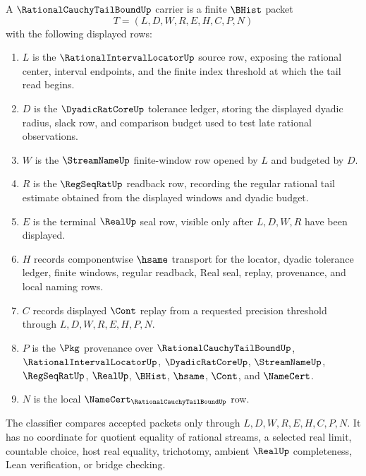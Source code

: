 \begin{definition}
\label{def:rational-cauchy-tail-bound-carrier}
A $\RationalCauchyTailBoundUp$ carrier is a finite $\BHist$ packet
$$
T=(L,D,W,R,E,H,C,P,N)
$$
with the following displayed rows:
\begin{enumerate}
\item $L$ is the $\RationalIntervalLocatorUp$ source row, exposing the rational center, interval endpoints, and the finite index threshold at which the tail read begins.
\item $D$ is the $\DyadicRatCoreUp$ tolerance ledger, storing the displayed dyadic radius, slack row, and comparison budget used to test late rational observations.
\item $W$ is the $\StreamNameUp$ finite-window row opened by $L$ and budgeted by $D$.
\item $R$ is the $\RegSeqRatUp$ readback row, recording the regular rational tail estimate obtained from the displayed windows and dyadic budget.
\item $E$ is the terminal $\RealUp$ seal row, visible only after $L,D,W,R$ have been displayed.
\item $H$ records componentwise $\hsame$ transport for the locator, dyadic tolerance ledger, finite windows, regular readback, Real seal, replay, provenance, and local naming rows.
\item $C$ records displayed $\Cont$ replay from a requested precision threshold through $L,D,W,R,E,H,P,N$.
\item $P$ is the $\Pkg$ provenance over $\RationalCauchyTailBoundUp$, $\RationalIntervalLocatorUp$, $\DyadicRatCoreUp$, $\StreamNameUp$, $\RegSeqRatUp$, $\RealUp$, $\BHist$, $\hsame$, $\Cont$, and $\NameCert$.
\item $N$ is the local $\NameCert_{\RationalCauchyTailBoundUp}$ row.
\end{enumerate}
The classifier compares accepted packets only through $L,D,W,R,E,H,C,P,N$. It has no coordinate for quotient equality of rational streams, a selected real limit, countable choice, host real equality, trichotomy, ambient $\RealUp$ completeness, Lean verification, or bridge checking.
\end{definition}

